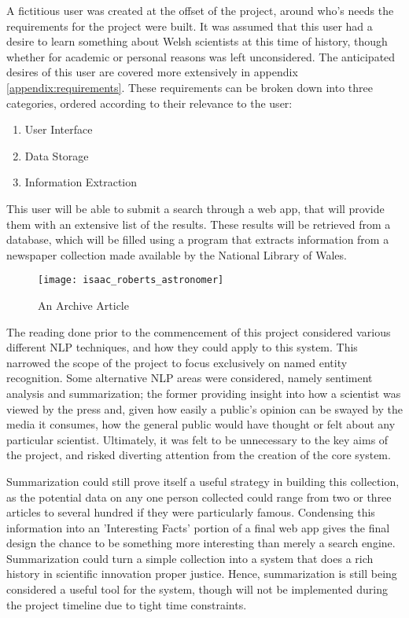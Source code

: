 \documentclass[11pt,a4paper]{book}
\begin{document}
A fictitious user was created at the offset of the project, around who's needs the requirements for the project were built. It was assumed that this user had a desire to learn something about Welsh scientists at this time of history, though whether for academic or personal reasons was left unconsidered. The anticipated desires of this user are covered more extensively in appendix \ref{appendix:requirements}. These requirements can be broken down into three categories, ordered according to their relevance to the user:
\begin{enumerate}
	\item User Interface
	\item Data Storage
	\item Information Extraction
\end{enumerate}

This user will be able to submit a search through a web app, that will provide them with an extensive list of the results. These results will be retrieved from a database, which will be filled using a program that extracts information from a newspaper collection made available by the National Library of Wales\cite{a_welsh_scientist}. 
\begin{figure}[H]
	\texttt{[image: isaac\_roberts\_astronomer]}
	\label{fig:exampleArticle}
	\caption{An Archive Article }
\end{figure}

The reading done prior to the commencement of this project considered various different NLP techniques, and how they could apply to this system. This narrowed the scope of the project to focus exclusively on named entity recognition. Some alternative NLP areas were considered, namely sentiment analysis and summarization; the former providing insight into how a scientist was viewed by the press and, given how easily a public's opinion can be swayed by the media it consumes, how the general public would have thought or felt about any particular scientist. Ultimately, it was felt to be unnecessary to the key aims of the project, and risked diverting attention from the creation of the core system. 

Summarization could still prove itself a useful strategy in building this collection, as the potential data on any one person collected could range from two or three articles to several hundred if they were particularly famous. Condensing this information into an 'Interesting Facts' portion of a final web app gives the final design the chance to be something more interesting than merely a search engine. Summarization could turn a simple collection into a system that does a rich history in scientific innovation proper justice. Hence, summarization is still being considered a useful tool for the system, though will not be implemented during the project timeline due to tight time constraints.
\end{document}
